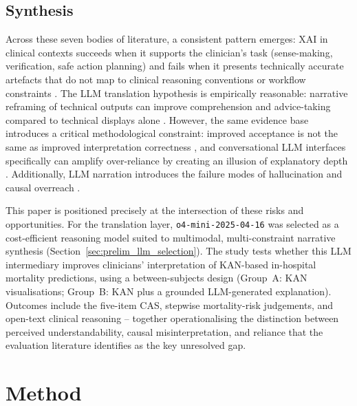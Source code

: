 \documentclass[12pt, a4paper]{article}
\begin{document}
\subsection{Synthesis}
\label{sec:prelim_synthesis}

Across these seven bodies of literature, a consistent pattern emerges: XAI in clinical
contexts succeeds when it supports the clinician's task (sense-making,
verification, safe action planning) and fails when it presents technically
accurate artefacts that do not map to clinical reasoning conventions or workflow
constraints \citep{tonekaboni2019clinicians, bienefeld2023solving,
anjara2023examining}. The LLM translation hypothesis is empirically reasonable:
narrative reframing of technical outputs can improve comprehension and
advice-taking compared to technical displays alone \citep{dams2025tell,
comparison2025shap}. However, the same evidence base introduces a critical
methodological constraint: improved acceptance is not the same as improved
interpretation correctness \citep{bansal2021does, bucinca2021trust}, and
conversational LLM interfaces specifically can amplify over-reliance by
creating an illusion of explanatory depth \citep{he2025conversational}.
Additionally, LLM narration introduces the failure modes of hallucination
and causal overreach \citep{omar2025hallucination, karimi2021algorithmic}.

This paper is positioned precisely at the intersection of these risks and
opportunities.
For the translation layer, \texttt{o4-mini-2025-04-16} was selected as a
cost-efficient reasoning model suited to multimodal, multi-constraint narrative
synthesis (Section~\ref{sec:prelim_llm_selection}).
The study tests whether this LLM intermediary improves clinicians'
interpretation of KAN-based in-hospital mortality predictions, using a
between-subjects design (Group~A: KAN visualisations; Group~B: KAN plus
a grounded LLM-generated explanation).
Outcomes include the five-item CAS, stepwise mortality-risk
judgements, and open-text clinical reasoning -- together operationalising
the distinction between perceived understandability, causal misinterpretation,
and reliance that the evaluation literature identifies as the key unresolved
gap.

\section{Method}
\label{sec:method}
\end{document}
